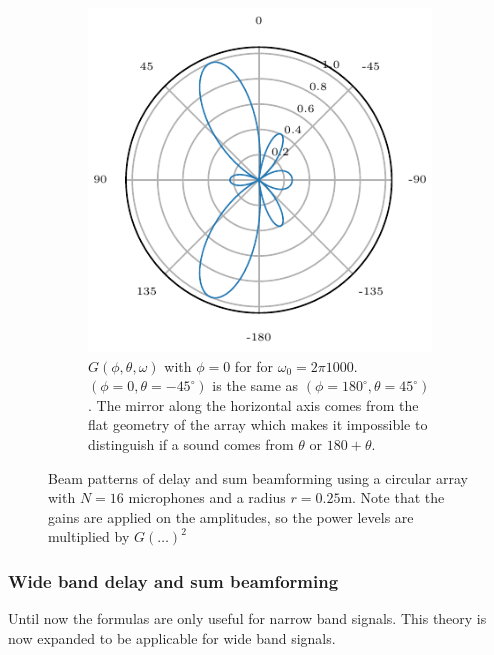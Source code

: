 \begin{figure}[h]
\begin{subfigure}[t]{0.45\textwidth}
		\includegraphics[width=\textwidth]{radial_1200_circ_theta_single.pdf}
		\caption{\(G(\phi, \theta, \omega)\) with $\phi = 0$ for for $\omega_0 = 2\pi 1000$. 
		$(\phi= 0, \theta = -45^\circ)$ is the same as $(\phi= 180^\circ, \theta = 45^\circ)$.
		The mirror along the horizontal axis comes from the flat geometry of the array which makes
		it impossible to distinguish if a sound comes from $\theta$ or $180 + \theta$.} 
		\label{ssl:fig:CircBmTheta}
	\end{subfigure}
	\caption{Beam patterns of delay and sum beamforming using a circular array with $N=16$ microphones 
	and a radius $r = 0.25$m. Note that the gains are applied on the amplitudes, so the 
	power levels are multiplied by $G(\dots)^2$}
	\label{ssl:fig:CircBmResponse}
\end{figure}

\subsubsection*{Wide band delay and sum beamforming}
Until now the formulas are only useful for narrow band signals. 
This theory is now expanded to be applicable for wide band signals.


